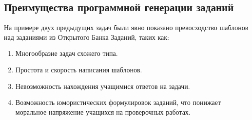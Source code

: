 \subsection{Преимущества программной генерации заданий}
На примере двух предыдущих задач были явно показано превосходство шаблонов над заданиями из Открытого Банка Заданий, таких как:
\begin{enumerate}
    \item Многообразие задач схожего типа.
    \item Простота и скорость написания шаблонов.
    \item Невозможность нахождения учащимися ответов на задачи. 
    \item Возможность юмористических формулировок заданий, что понижает моральное напряжение учащихся на проверочных работах.%
\end{enumerate}

